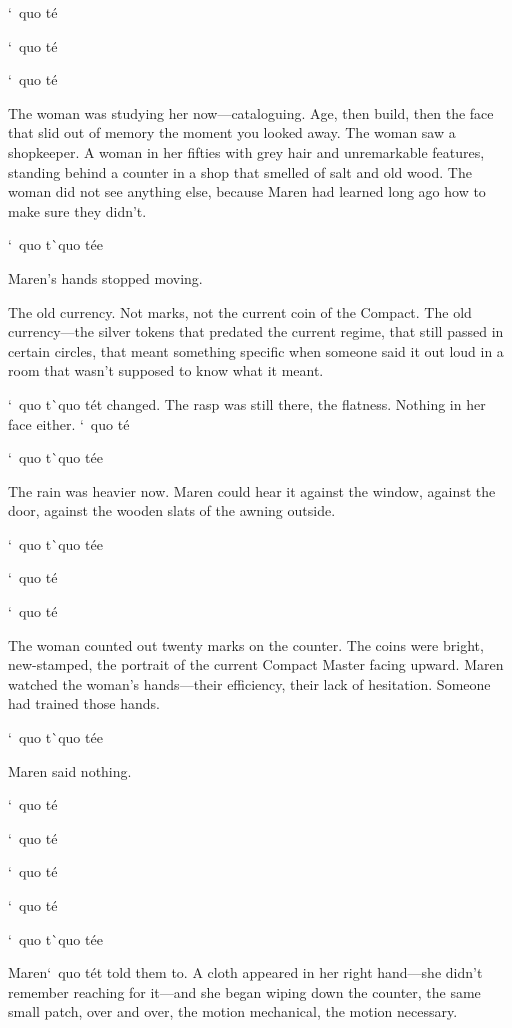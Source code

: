 \documentclass[12pt,letterpaper,openany]{book}
\begin{document}
`\ quo t\'e{}
\par
`\ quo t\'e{}
\par
`\ quo t\'e{}
\par
The woman was studying her now—cataloguing. Age, then build, then the face that slid out of memory the moment you looked away. The woman saw a shopkeeper. A woman in her fifties with grey hair and unremarkable features, standing behind a counter in a shop that smelled of salt and old wood. The woman did not see anything else, because Maren had learned long ago how to make sure they didn't.
\par
`\ quo t\`\ quo t\'e{}e{}
\par
Maren's hands stopped moving.
\par
The old currency. Not marks, not the current coin of the Compact. The old currency—the silver tokens that predated the current regime, that still passed in certain circles, that meant something specific when someone said it out loud in a room that wasn't supposed to know what it meant.
\par
`\ quo t\`\ quo t\'e{}t changed. The rasp was still there, the flatness. Nothing in her face either. `\ quo t\'e{}
\par
`\ quo t\`\ quo t\'e{}e{}
\par
The rain was heavier now. Maren could hear it against the window, against the door, against the wooden slats of the awning outside.
\par
`\ quo t\`\ quo t\'e{}e{}
\par
`\ quo t\'e{}
\par
`\ quo t\'e{}
\par
The woman counted out twenty marks on the counter. The coins were bright, new-stamped, the portrait of the current Compact Master facing upward. Maren watched the woman's hands—their efficiency, their lack of hesitation. Someone had trained those hands.
\par
`\ quo t\`\ quo t\'e{}e{}
\par
Maren said nothing.
\par
`\ quo t\'e{}
\par
`\ quo t\'e{}
\par
`\ quo t\'e{}
\par
`\ quo t\'e{}
\par
`\ quo t\`\ quo t\'e{}e{}
\par
Maren`\ quo t\'e{}t told them to. A cloth appeared in her right hand—she didn't remember reaching for it—and she began wiping down the counter, the same small patch, over and over, the motion mechanical, the motion necessary.
\end{document}
